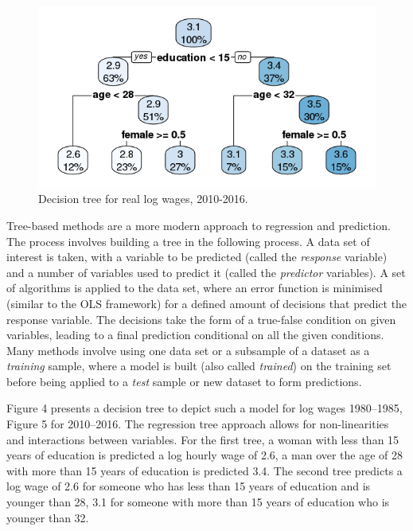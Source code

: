 \documentclass[notitlepage,12pt]{article}
\begin{document}
\begin{figure}
  \centering
  \caption{Decision tree for real log wages, 2010-2016.}
  \includegraphics[width=\textwidth]{Rpat2010_2016.png}
\end{figure}

Tree-based methods are a more modern approach to regression and prediction.  The process involves building a tree in the following process.  A data set of interest is taken, with a variable to be predicted (called the \textit{response} variable) and a number of variables used to predict it (called the \textit{predictor} variables).  A set of algorithms is applied to the data set, where an error function is minimised (similar to the OLS framework) for a defined amount of decisions that predict the response variable.  The decisions take the form of a true-false condition on given variables, leading to a final prediction conditional on all the given conditions.  Many methods involve using one data set or a subsample of a dataset as a \textit{training} sample, where a model is built (also called \textit{trained}) on the training set before being applied to a \textit{test} sample or new dataset to form predictions.

Figure 4 presents a decision tree to depict such a model for log wages 1980--1985, Figure 5 for 2010--2016.  The regression tree approach allows for non-linearities and interactions between variables.  For the first tree, a woman with less than 15 years of education is predicted a log hourly wage of 2.6, a man over the age of 28 with more than 15 years of education is predicted 3.4.  The second tree predicts a log wage of 2.6 for someone who has less than 15 years of education and is younger than 28, 3.1 for someone with more than 15 years of education who is younger than 32.
\end{document}
